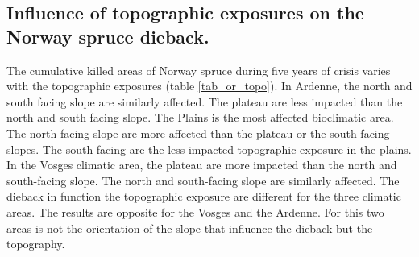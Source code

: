 \documentclass[3p,procedia]{elsarticle}
\begin{document}


	


\subsection{Influence of topographic exposures on the Norway spruce dieback.}

The cumulative killed areas of Norway spruce during five years of crisis varies with the topographic exposures (table \ref{tab_or_topo}).
In Ardenne, the north and south facing slope are similarly affected. 
The plateau are less impacted than the north and south facing slope.
The Plains is the most affected bioclimatic area. 
The north-facing slope are more affected than the plateau or the south-facing slopes.
The south-facing are the less impacted topographic exposure in the plains.
In the Vosges climatic area, the plateau are more impacted than the north and south-facing slope.
The north and south-facing slope are similarly affected.
The dieback in function the topographic exposure are different for the three climatic areas.
The results are opposite for the Vosges and the Ardenne.
For this two areas is not the orientation of the slope that influence the dieback but the topography.
\end{document}
